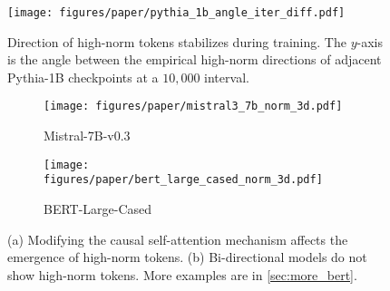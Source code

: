 
\begin{figure}[t]
    \centering
    \texttt{[image: figures/paper/pythia\_1b\_angle\_iter\_diff.pdf]}
    \vspace{-0.5em}
    \caption{Direction of high-norm tokens stabilizes during training.
    The \(y\)-axis is the angle between the empirical high-norm directions of adjacent Pythia-1B checkpoints at a \(10,000\) interval.
    }\label{fig:stable_dir}
    \vspace{-0.5em}
\end{figure}

\begin{figure}[t]
    \centering
    \begin{subfigure}[t]{0.45\linewidth}
        \texttt{[image: figures/paper/mistral3\_7b\_norm\_3d.pdf]}
        \caption{Mistral-7B-v0.3}\label{fig:mistral3_7b_norm_3d}
    \end{subfigure}
    \begin{subfigure}[t]{0.45\linewidth}
        \texttt{[image: figures/paper/bert\_large\_cased\_norm\_3d.pdf]}
        \caption{BERT-Large-Cased}\label{fig:bert_large_cased_norm_3d}
    \end{subfigure}
    \vspace{-0.5em}
    \caption{(a) Modifying the causal self-attention mechanism affects the emergence of high-norm tokens.
    (b) Bi-directional models do not show high-norm tokens.
    More examples are in \cref{sec:more_bert}.
    }\label{fig:factors}
    \vspace{-0.5em}
\end{figure}


